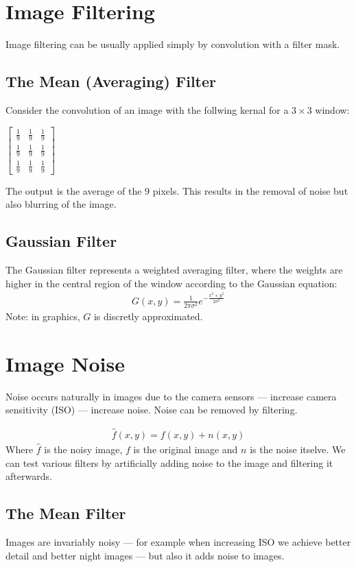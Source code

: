\documentclass{article}
\newcommand{\ninth}{\frac{1}{9}}
\begin{document}
\section{Image Filtering}
Image filtering can be usually applied simply by convolution with a filter mask.

\subsection{The Mean (Averaging) Filter}
Consider the convolution of an image with the follwing kernal for a $3 \times 3$ window:
\smallskip
\centerline{$
\begin{bmatrix}
	\ninth & \ninth & \ninth \\
	\ninth & \ninth & \ninth \\
	\ninth & \ninth & \ninth
\end{bmatrix}
$}
The output is the average of the 9 pixels.
This results in the removal of noise but also blurring of the image.

\subsection{Gaussian Filter}
The Gaussian filter represents a weighted averaging filter, where the weights are higher in the central region of the window according to the Gaussian equation:
\begin{align*}
G(x,y) = \frac{1}{2\pi\sigma^2}e^{-\frac{x^2+y^2}{2\sigma^2}}
\end{align*}
Note: in graphics, $G$ is discretly approximated. 

\section{Image Noise}
Noise occurs naturally in images due to the camera sensors --- increase camera sensitivity (ISO) --- increase noise.
Noise can be removed by filtering.

\medskip
\begin{align*}
	\hat{f}(x,y) = f(x,y) + n(x,y)
\end{align*}
Where $\hat{f}$ is the noisy image, $f$ is the original image and $n$ is the noise itselve.
We can test various filters by artificially adding noise to the image and filtering it afterwards.
\subsection{The Mean  Filter}
Images are invariably noisy --- for example when increasing ISO we achieve better detail and better night images --- but also it adds noise to images.
\end{document}
